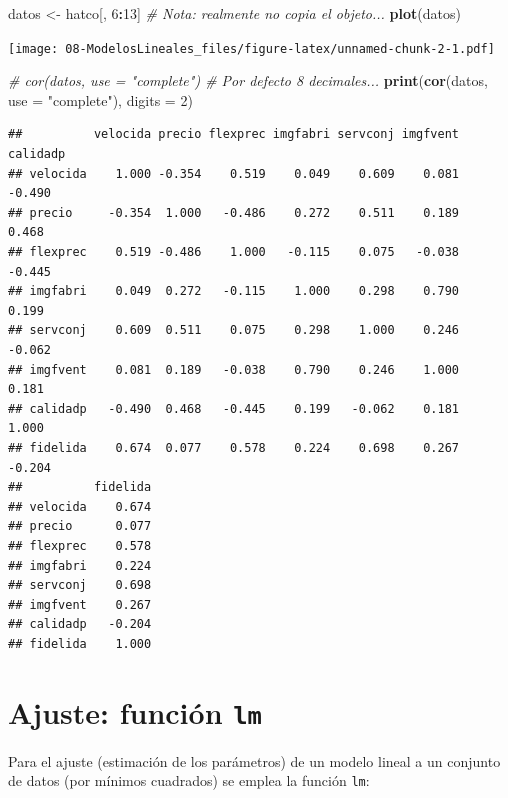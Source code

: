 \documentclass[]{book}
\newenvironment{Shaded}{\begin{snugshade}}{\end{snugshade}}
\newcommand{\CommentTok}[1]{\textcolor[rgb]{0.56,0.35,0.01}{\textit{#1}}}
\newcommand{\DataTypeTok}[1]{\textcolor[rgb]{0.13,0.29,0.53}{#1}}
\newcommand{\DecValTok}[1]{\textcolor[rgb]{0.00,0.00,0.81}{#1}}
\newcommand{\KeywordTok}[1]{\textcolor[rgb]{0.13,0.29,0.53}{\textbf{#1}}}
\newcommand{\NormalTok}[1]{#1}
\newcommand{\OperatorTok}[1]{\textcolor[rgb]{0.81,0.36,0.00}{\textbf{#1}}}
\newcommand{\StringTok}[1]{\textcolor[rgb]{0.31,0.60,0.02}{#1}}
\begin{document}
\begin{Shaded}
\begin{Highlighting}[]
\NormalTok{datos <-}\StringTok{ }\NormalTok{hatco[, }\DecValTok{6}\OperatorTok{:}\DecValTok{13}\NormalTok{]  }\CommentTok{# Nota: realmente no copia el objeto...}
\KeywordTok{plot}\NormalTok{(datos)}
\end{Highlighting}
\end{Shaded}

\texttt{[image: 08-ModelosLineales\_files/figure-latex/unnamed-chunk-2-1.pdf]}

\begin{Shaded}
\begin{Highlighting}[]
\CommentTok{# cor(datos, use = "complete") # Por defecto 8 decimales...}
\KeywordTok{print}\NormalTok{(}\KeywordTok{cor}\NormalTok{(datos, }\DataTypeTok{use =} \StringTok{"complete"}\NormalTok{), }\DataTypeTok{digits =} \DecValTok{2}\NormalTok{)}
\end{Highlighting}
\end{Shaded}

\begin{verbatim}
##          velocida precio flexprec imgfabri servconj imgfvent calidadp
## velocida    1.000 -0.354    0.519    0.049    0.609    0.081   -0.490
## precio     -0.354  1.000   -0.486    0.272    0.511    0.189    0.468
## flexprec    0.519 -0.486    1.000   -0.115    0.075   -0.038   -0.445
## imgfabri    0.049  0.272   -0.115    1.000    0.298    0.790    0.199
## servconj    0.609  0.511    0.075    0.298    1.000    0.246   -0.062
## imgfvent    0.081  0.189   -0.038    0.790    0.246    1.000    0.181
## calidadp   -0.490  0.468   -0.445    0.199   -0.062    0.181    1.000
## fidelida    0.674  0.077    0.578    0.224    0.698    0.267   -0.204
##          fidelida
## velocida    0.674
## precio      0.077
## flexprec    0.578
## imgfabri    0.224
## servconj    0.698
## imgfvent    0.267
## calidadp   -0.204
## fidelida    1.000
\end{verbatim}

\hypertarget{ajuste-funcion-lm}{%
\section{\texorpdfstring{Ajuste: función \texttt{lm}}{Ajuste: función lm}}\label{ajuste-funcion-lm}}

Para el ajuste (estimación de los parámetros) de un modelo lineal a un conjunto de datos (por mínimos cuadrados) se emplea la función \texttt{lm}:
\end{document}
